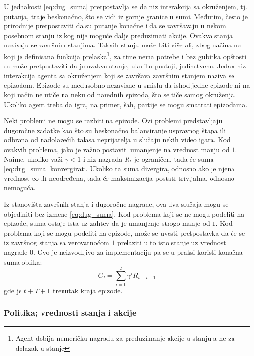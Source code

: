 U jednakosti \eqref{eq:dug_suma} pretpostavlja se da niz interakcija sa okruženjem, tj. putanja, traje beskonačno, što se vidi iz gornje granice u sumi. Međutim, često je prirodnije pretpostaviti da su putanje konačne i da se završavaju u nekom posebnom stanju iz kog nije moguće dalje preduzimati akcije. Ovakva stanja nazivaju se završnim stanjima. Takvih stanja može biti više ali, zbog načina na koji je definisana funkcija prelaska\footnote{Agent dobija numeričku nagradu za preduzimanje akcije u stanju a ne za dolazak u stanje}, za time nema potrebe i bez gubitka opštosti se može pretpostaviti da je ovakvo stanje, ukoliko postoji, jedinstveno. Jedan niz interakcija agenta sa okruženjem koji se završava završnim stanjem naziva se epizodom. Epizode su međusobno nezavisne u smislu da ishod jedne epizode ni na koji način ne utiče na neku od narednih epizoda, što se tiče samog okruženja. Ukoliko agent treba da igra, na primer, šah, partije se mogu smatrati epizodama. 
\par 
Neki problemi ne mogu se razbiti na epizode. Ovi problemi predstavljaju dugoročne zadatke kao što su beskonačno balansiranje uspravnog štapa ili odbrana od nadolazećih talasa neprijatelja u slučaju nekih video igara. Kod ovakvih problema, jako je važno postaviti umanjenje na vrednost manju od $1$. Naime, ukoliko važi $\gamma < 1$ i niz nagrada $R_t$ je ograničen, tada će suma \eqref{eq:dug_suma} konvergirati. Ukoliko ta suma divergira, odnosno ako je njena vrednost $\infty$ ili neodređena, tada će maksimizacija postati trivijalna, odnosno nemoguća.
\par 
Iz stanovišta završnih stanja i dugoročne nagrade, ova dva slučaja mogu se objediniti bez izmene \eqref{eq:dug_suma}. Kod problema koji se ne mogu podeliti na epizode, suma ostaje ista uz zahtev da je umanjenje strogo manje od $1$. Kod problema koji se mogu podeliti na epizode, može se uvesti pretpostavka da će se iz završnog stanja sa verovatnoćom $1$ prelaziti u to isto stanje uz vrednost nagrade $0$. Ovo je neizvodljivo za implementaciju pa se u praksi koristi konačna suma oblika:
\begin{equation}
	G_t = \sum_{i=0}^{T} \gamma^iR_{t+i+1}
\end{equation}
gde je $t+T+1$ trenutak kraja epizode. 

\subsubsection{Politika; vrednosti stanja i akcije}

